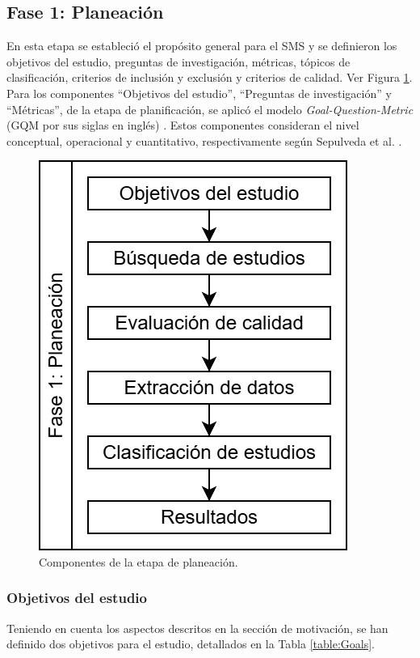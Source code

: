 \subsection{Fase 1: Planeación}\label{sec:planeacion}
En esta etapa se estableció el propósito general para el SMS y se definieron los objetivos del estudio, preguntas de investigación, métricas, tópicos de clasificación, criterios de inclusión y exclusión y criterios de calidad. Ver Figura \ref{fig:PlanningStageOverview}.
Para los componentes ``Objetivos del estudio'', ``Preguntas de investigación'' y ``Métricas'', de la etapa de planificación, se aplicó el modelo {\itshape Goal-Question-Metric} (GQM por sus siglas en inglés) \cite{basili1992software, caldiera1994goal}. Estos componentes consideran el nivel conceptual, operacional y cuantitativo, respectivamente según Sepulveda et al. \cite{Sepúlveda202141}.

\begin{figure}[htbp]
	\centering
	\vspace{10pt}
	\includegraphics[scale=0.7]{resources/figures/sms-Etapa-1 overview.drawio.png}
	\vspace{6pt}
	\caption{Componentes de la etapa de planeación.}
	\label{fig:PlanningStageOverview}
\end{figure}

\subsubsection{Objetivos del estudio}
Teniendo en cuenta los aspectos descritos en la sección de motivación, se han definido dos objetivos para el estudio, detallados en la Tabla \ref{table:Goals}.

